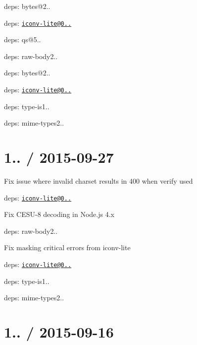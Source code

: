 \begin{DoxyItemize}
\item deps\+: bytes@2..
\item deps\+: \href{mailto:iconv-lite@0.4.13}{\tt iconv-\/lite@0..}
\item deps\+: qs@5..
\item deps\+: raw-\/body2..
\begin{DoxyItemize}
\item deps\+: bytes@2..
\item deps\+: \href{mailto:iconv-lite@0.4.13}{\tt iconv-\/lite@0..}
\end{DoxyItemize}
\item deps\+: type-\/is1..
\begin{DoxyItemize}
\item deps\+: mime-\/types2..
\end{DoxyItemize}
\end{DoxyItemize}

\section*{1.. / 2015-\/09-\/27 }


\begin{DoxyItemize}
\item Fix issue where invalid charset results in 400 when {\ttfamily verify} used
\item deps\+: \href{mailto:iconv-lite@0.4.12}{\tt iconv-\/lite@0..}
\begin{DoxyItemize}
\item Fix C\+E\+S\+U-\/8 decoding in Node.\+js 4.\+x
\end{DoxyItemize}
\item deps\+: raw-\/body2..
\begin{DoxyItemize}
\item Fix masking critical errors from {\ttfamily iconv-\/lite}
\item deps\+: \href{mailto:iconv-lite@0.4.12}{\tt iconv-\/lite@0..}
\end{DoxyItemize}
\item deps\+: type-\/is1..
\begin{DoxyItemize}
\item deps\+: mime-\/types2..
\end{DoxyItemize}
\end{DoxyItemize}

\section*{1.. / 2015-\/09-\/16 }


